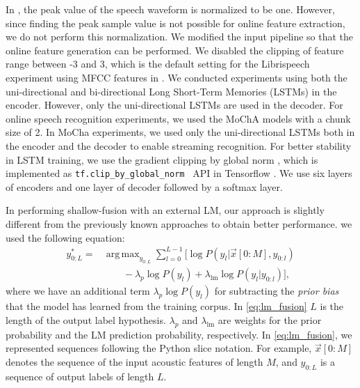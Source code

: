 \documentclass{article}
\DeclareMathOperator*{\argmax}{arg\,max}
\begin{document}
In \cite{a_zeyer_interspeech_2018_00}, the peak value of the speech 
waveform is normalized to be one. However, since finding the peak sample value 
is not possible for online feature extraction, we do not perform this
normalization. We modified the input pipeline
so that the online feature generation can be performed. We disabled the 
clipping of feature range between -3 and 3, which is the default 
setting for the Librispeech experiment using MFCC 
features in \cite{a_zeyer_interspeech_2018_00}. 
We conducted experiments using both the 
uni-directional and bi-directional Long Short-Term Memories (LSTMs)
\cite{S_Hochreiter_neural_computation_1997_00} in the encoder.
However, only the uni-directional LSTMs are used in the decoder.
For online speech recognition experiments, we used the
MoChA models \cite{c_chiu_iclr_2018_00} with a chunk size of 2.
In MoCha experiments, we used only the uni-directional LSTMs 
both in the encoder and the decoder to enable streaming recognition.
 For better stability in LSTM training, we use the gradient clipping by  
global norm \cite{r_pascanu_icml_2013}, which is implemented as  
{\tt tf.clip\_by\_global\_norm } API in Tensorflow  \cite{m_abadi_usenix_2016}.
We use six layers of encoders and one layer of decoder followed by a softmax
layer.

In performing shallow-fusion with an external LM, our approach is slightly 
different from the previously known approaches 
\cite{c_gulcehre_corr_2015_00, s_toshniwal_slt_2018_00} to obtain better 
performance.
we used the following equation:
\begin{align}
  y_{0:L}^{*} = & \argmax_{y_{0:L}} \sum_{l=0}^{L-1} \Big[ \log P \left(y_l
  |\vec{x}[0:M], y_{0:l} \right)
  \nonumber \\
                           & \qquad - \lambda_p \log P(y_l) 
                           + \lambda_{\text{lm}} \log P \left(y_l   |y_{0:l} \right)  \Big],
                           \label{eq:lm_fusion}
\end{align}
where we have an additional term $\lambda_p \log P(y_l) $ for subtracting 
the {\it prior bias} that the model has learned from the training corpus. 
In \eqref{eq:lm_fusion} $L$ is the 
length of the output label hypothesis. $\lambda_p$ and $\lambda_{\text{lm}}$ are 
weights for the prior probability and the LM prediction probability, 
respectively.
In \eqref{eq:lm_fusion}, we represented sequences following the Python slice
notation. For example, $\vec{x}[0:M]$ denotes the sequence of the input acoustic
features of length $M$, and $y_{0:L}$ is a sequence of output labels  of length $L$.
%
%
%
%
\end{document}
